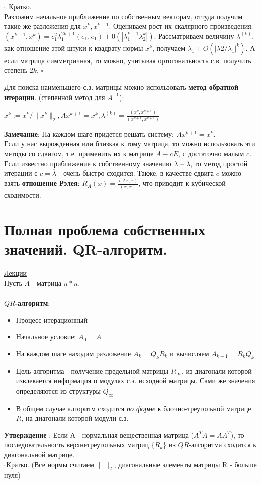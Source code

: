 \documentclass[specialist, subf, href, colorlinks=true, 12pt, times, mtpro, final]{disser}
\theoremstyle{definition}
\begin{document}
	$\square$ Кратко.\\
	Разложим начальное приближение по собственным векторам, оттуда получим такие же разложения для $x^k, x^{k+1}$. Оцениваем рост их скалярного произведения: $(x^{k+1}, x^k) = c^2_1 \lambda^{2k+1}_1 (e_1, e_1) + 0(|\lambda^{k+1}_1\lambda^k_2|)$.
	Рассматриваем величину $\lambda^{(k)}$, как отношение этой штуки к квадрату нормы $x^k$,  получаем $\lambda_1 + O(|\lambda2/\lambda_1|^k)$. А если матрица симметричная, то можно, учитывая ортогональность с.в. получить степень $2k$. 
	$\square$
	
	
	Для поиска наименьшего с.з. матрицы можно использовать \textbf{метод обратной итерации}. (степенной метод для $A^{-1}$):\\
	\begin{center}
	$x^k := x^k / \|x^k\|_2, Ax^{k+1} = x^k, \lambda^{(k)} = \frac{(x^k, x^{k+1})}{(x^{k+1}, x^{k+1})}$
	\end{center}
	
	\textbf{Замечание}: На каждом шаге придется решать систему: $Ax^{k+1} = x^k$.
\\
Если у нас вырожденная или близкая к тому матрица, то можно использовать эти методы со сдвигом, т.е. применить их к матрице $A-cE$, с достаточно малым $c$.  Если известно приближение к собственному значению $\lambda$ \--- $\overline{\lambda}$, то метод простой итерации с $c = \overline{\lambda}$ - очень быстро сходится. Также, в качестве сдвига $c$ можно взять \textbf{отношение Рэлея}: $R_A(x) = \frac{(Ax, x)}{(x, x)}$, что приводит к кубической сходимости.
	
	

\section {Полная проблема собственных значений. QR-алгоритм.}
	\hyperlink {lects.79}{Лекции}\\
	
Пусть $A$ - матрица $n*n$.
\\
\\
\textbf{$QR$-алгоритм}:
\begin{itemize}
\item Процесс итерационный
\item Начальное условие: $A_0 = A$
\item На каждом шаге находим разложение $A_k = Q_kR_k$ и  вычисляем $A_{k+1} = R_k Q_k $
\item Цель алгоритма - получение предельной матрицы $R_{\infty}$, из диагонали которой извлекается информация о  модулях с.з. исходной матрицы. Сами же значения определяются из структуры $Q_{\infty}$

\item В общем случае алгоритм сходится \textit{по форме} к блочно-треугольной матрице $R$, на диагонали которой модули с.з.
\end{itemize}
\textbf{Утверждение }:
Если $А$ - нормальная вещественная матрица ($A^TA = AA^T$), то последовательность верхнетреугольных матриц $\{R_k\}$ из $QR$-алгоритма сходится к диагональной матрице.
\\
$\square$Кратко. (Все нормы считаем $\|\|_2$, диагональные элементы матрицы R - больше нуля)\\
\end{document}
